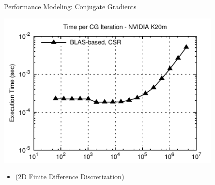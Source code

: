 \begin{frame}[fragile]{Performance Modeling: Conjugate Gradients}

 \begin{block}{}
 
 \begin{center}
  \vspace*{-0.5cm}
  \includegraphics[width=0.85\textwidth]{figures/cg-k20m-0}
 \end{center}

 \begin{itemize}
  \item   \vspace*{-0.3cm} {\small (2D Finite Difference Discretization)}
 \end{itemize}

 \end{block}
   
\end{frame}


